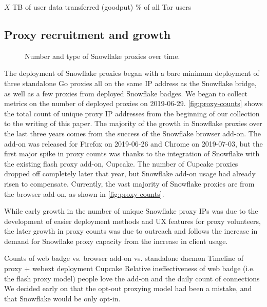 \documentclass[letterpaper,twocolumn]{article}
\begin{document}
$X$ TB of user data transferred (goodput)
\% of all Tor users

\subsection{Proxy recruitment and growth}
\label{sec:proxies}

\begin{figure}
\caption{Number and type of Snowflake proxies over time.}
\label{fig:proxy-counts}
\end{figure}

The deployment of Snowflake proxies began with a bare minimum deployment
of three standalone Go proxies all on the same IP address as the Snowflake bridge,
as well as a few proxies from deployed Snowflake badges.
We began to collect metrics on the number of deployed proxies on \mbox{2019-06-29}.
\autoref{fig:proxy-counts} shows the total count of unique proxy IP addresses
from the beginning of our collection to the writing of this paper.
The majority of the growth in Snowflake proxies over the last three years comes from
the success of the Snowflake browser add-on.
The add-on was released for Firefox on \mbox{2019-06-26} and Chrome on \mbox{2019-07-03},
but the first major spike in proxy counts was thanks to the integration
of Snowflake with the existing flash proxy add-on, Cupcake.
The number of Cupcake proxies dropped off completely later that year,
but Snowflake add-on usage had already risen to compensate.
Currently, the vast majority of Snowflake proxies are from the browser add-on,
as shown in \autoref{fig:proxy-counts}.

While early growth in the number of unique Snowflake proxy IPs
was due to the development of easier deployment methods and UX features for proxy volunteers,
the later growth in proxy counts was due to outreach
and follows the increase in demand for Snowflake proxy capacity from the increase in client usage. 

Counts of web badge vs. browser add-on vs. standalone daemon
Timeline of proxy + webext deployment
Cupcake
Relative ineffectiveness of web badge (i.e. the flash proxy model)
people love the add-on and the daily count of connections
We decided early on that the opt-out proxying model had been a mistake,
and that Snowflake would be only opt-in.
\end{document}

